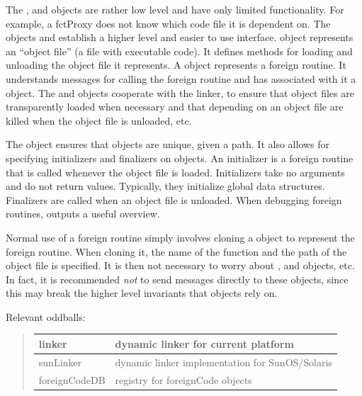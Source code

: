 \documentclass[letterpaper,10pt,english]{sphinxmanual}
\begin{document}
The ,  and  objects are rather low level and have only limited functionality.
For example, a fctProxy does not know which code file it is dependent on. The objects
 and  establish a higher level and easier to use interface. 
object represents an “object file” (a file with executable code). It defines methods for loading
and unloading the object file it represents. A  object represents a foreign routine. It
understands messages for calling the foreign routine and has associated with it a 
object. The  and  objects cooperate with the linker, to ensure that
object files are transparently loaded when necessary and that  depending on an object
file are killed when the object file is unloaded, etc.

The  object ensures that  objects are unique, given a path. It also
allows for specifying initializers and finalizers on  objects. An initializer is a foreign
routine that is called whenever the object file is loaded. Initializers take no arguments and do not
return values. Typically, they initialize global data structures. Finalizers are called when an object
file is unloaded. When debugging foreign routines,  outputs a
useful overview.

Normal use of a foreign routine simply involves cloning a  object to represent the foreign
routine. When cloning it, the name of the function and the path of the object file is specified.
It is then not necessary to worry about ,  and  objects, etc. In fact, it is
recommended \emph{not} to send messages directly to these objects, since this may break the higher level
invariants that  objects rely on.

Relevant oddballs:
\begin{quote}

\begin{tabulary}{\linewidth}{|L|L|}
\hline

linker
 & 
dynamic linker for current platform
\\\hline

sunLinker
 & 
dynamic linker implementation for SunOS/Solaris
\\\hline

foreignCodeDB
 & 
registry for foreignCode objects
\\\hline
\end{tabulary}

\end{quote}
\end{document}
